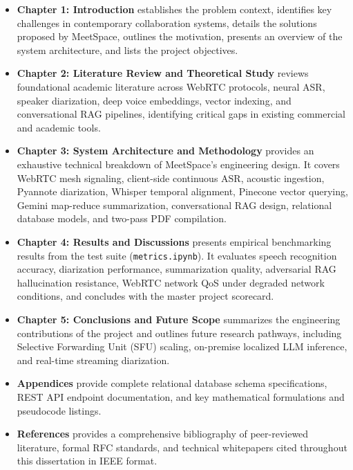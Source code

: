 \documentclass[12pt,oneside,letterpaper]{report}
\numberwithin{equation}{chapter} %
\begin{document}
\begin{itemize}
    \item \textbf{Chapter 1: Introduction} establishes the problem context, identifies key challenges in contemporary collaboration systems, details the solutions proposed by MeetSpace, outlines the motivation, presents an overview of the system architecture, and lists the project objectives.
    
    \item \textbf{Chapter 2: Literature Review and Theoretical Study} reviews foundational academic literature across WebRTC protocols, neural ASR, speaker diarization, deep voice embeddings, vector indexing, and conversational RAG pipelines, identifying critical gaps in existing commercial and academic tools.
    
    \item \textbf{Chapter 3: System Architecture and Methodology} provides an exhaustive technical breakdown of MeetSpace's engineering design. It covers WebRTC mesh signaling, client-side continuous ASR, acoustic ingestion, Pyannote diarization, Whisper temporal alignment, Pinecone vector querying, Gemini map-reduce summarization, conversational RAG design, relational database models, and two-pass PDF compilation.
    
    \item \textbf{Chapter 4: Results and Discussions} presents empirical benchmarking results from the test suite (\texttt{metrics.ipynb}). It evaluates speech recognition accuracy, diarization performance, summarization quality, adversarial RAG hallucination resistance, WebRTC network QoS under degraded network conditions, and concludes with the master project scorecard.
    
    \item \textbf{Chapter 5: Conclusions and Future Scope} summarizes the engineering contributions of the project and outlines future research pathways, including Selective Forwarding Unit (SFU) scaling, on-premise localized LLM inference, and real-time streaming diarization.
    
    \item \textbf{Appendices} provide complete relational database schema specifications, REST API endpoint documentation, and key mathematical formulations and pseudocode listings.
    
    \item \textbf{References} provides a comprehensive bibliography of peer-reviewed literature, formal RFC standards, and technical whitepapers cited throughout this dissertation in IEEE format.
\end{itemize}
\end{document}
